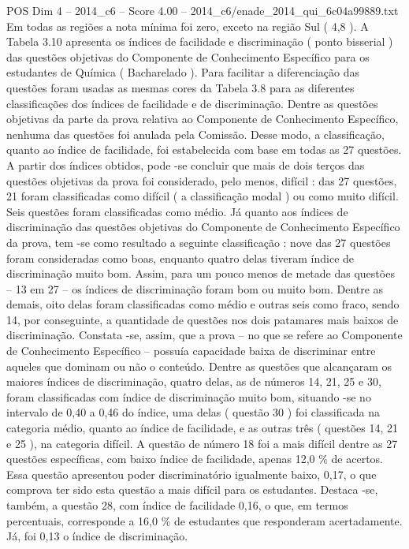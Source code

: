 \begin{textsample}{POS Dim 4 – 2014\_c6 – Score 4.00 – 2014\_c6/enade\_2014\_qui\_6c04a99889.txt}
Em todas as regiões a nota mínima foi zero, exceto na região Sul ( 4,8 ).
A Tabela 3.10 apresenta os índices de facilidade e discriminação ( ponto bisserial ) das questões objetivas do Componente de Conhecimento Específico para os estudantes de Química ( Bacharelado ).
Para facilitar a diferenciação das questões foram usadas as mesmas cores da Tabela 3.8 para as diferentes classificações dos índices de facilidade e de discriminação.
Dentre as questões objetivas da parte da prova relativa ao Componente de Conhecimento Específico, nenhuma das questões foi anulada pela Comissão.
Desse modo, a classificação, quanto ao índice de facilidade, foi estabelecida com base em todas as 27 questões.
A partir dos índices obtidos, pode -se concluir que mais de dois terços das questões objetivas da prova foi considerado, pelo menos, difícil : das 27 questões, 21 foram classificadas como difícil ( a classificação modal ) ou como muito difícil.
Seis questões foram classificadas como médio.
Já quanto aos índices de discriminação das questões objetivas do Componente de Conhecimento Específico da prova, tem -se como resultado a seguinte classificação : nove das 27 questões foram consideradas como boas, enquanto quatro delas tiveram índice de discriminação muito bom.
Assim, para um pouco menos de metade das questões – 13 em 27 – os índices de discriminação foram bom ou muito bom.
Dentre as demais, oito delas foram classificadas como médio e outras seis como fraco, sendo 14, por conseguinte, a quantidade de questões nos dois patamares mais baixos de discriminação.
Constata -se, assim, que a prova – no que se refere ao Componente de Conhecimento Específico – possuía capacidade baixa de discriminar entre aqueles que dominam ou não o conteúdo.
Dentre as questões que alcançaram os maiores índices de discriminação, quatro delas, as de números 14, 21, 25 e 30, foram classificadas com índice de discriminação muito bom, situando -se no intervalo de 0,40 a 0,46 do índice, uma delas ( questão 30 ) foi classificada na categoria médio, quanto ao índice de facilidade, e as outras três ( questões 14, 21 e 25 ), na categoria difícil.
A questão de número 18 foi a mais difícil dentre as 27 questões específicas, com baixo índice de facilidade, apenas 12,0 \% de acertos.
Essa questão apresentou poder discriminatório igualmente baixo, 0,17, o que comprova ter sido esta questão a mais difícil para os estudantes.
Destaca -se, também, a questão 28, com índice de facilidade 0,16, o que, em termos percentuais, corresponde a 16,0 \% de estudantes que responderam acertadamente.
Já, foi 0,13 o índice de discriminação.

\end{textsample}
